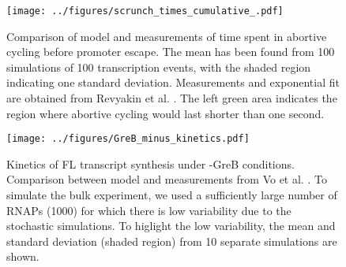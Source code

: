 \begin{figure}
    \begin{center}
      \texttt{[image: ../figures/scrunch\_times\_cumulative\_.pdf]}
    \end{center}
    \caption{Comparison of model and measurements of time spent in abortive
        cycling before promoter escape. The mean has been found from 100
        simulations of 100 transcription events, with the shaded region
        indicating one standard deviation. Measurements and exponential fit
        are obtained from Revyakin et al. \cite{revyakin_abortive_2006}. The
        left green area indicates the region where abortive cycling would last
        shorter than one second.}
\label{fig:revyakin_fit}
\end{figure}

\begin{figure}
    \begin{center}
        \texttt{[image: ../figures/GreB\_minus\_kinetics.pdf]}
    \end{center}
    \caption{Kinetics of FL transcript synthesis under -GreB conditions.
      Comparison between model and measurements from Vo
      et al. \cite{vo_vitro_2003-1}. To simulate the bulk experiment, we
      used a sufficiently large number of RNAPs (1000) for which there is low
      variability due to the stochastic simulations. To higlight the low
      variability, the mean and standard deviation (shaded region) from 10
      separate simulations are shown.}
\label{fig:vo_comparison}
\end{figure}
